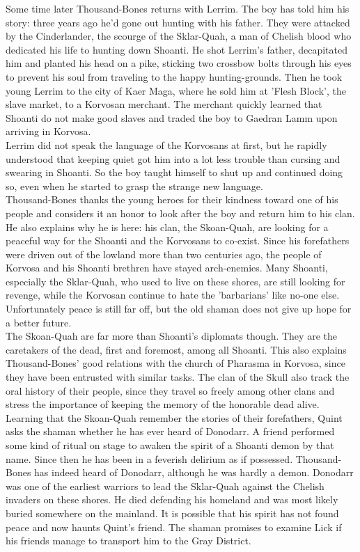 Some time later Thousand-Bones returns with Lerrim. The boy has told him his story: three years ago he'd gone out hunting with his father. They were attacked by the Cinderlander, the scourge of the Sklar-Quah, a man of Chelish blood who dedicated his life to hunting down Shoanti. He shot Lerrim's father, decapitated him and planted his head on a pike, sticking two crossbow bolts through his eyes to prevent his soul from traveling to the happy hunting-grounds. Then he took young Lerrim to the city of Kaer Maga, where he sold him at 'Flesh Block', the slave market, to a Korvosan merchant. The merchant quickly learned that Shoanti do not make good slaves and traded the boy to Gaedran Lamm upon arriving in Korvosa.\\

Lerrim did not speak the language of the Korvosans at first, but he rapidly understood that keeping quiet got him into a lot less trouble than cursing and swearing in Shoanti. So the boy taught himself to shut up and continued doing so, even when he started to grasp the strange new language.\\

Thousand-Bones thanks the young heroes for their kindness toward one of his people and considers it an honor to look after the boy and return him to his clan. He also explains why he is here: his clan, the Skoan-Quah, are looking for a peaceful way for the Shoanti and the Korvosans to co-exist. Since his forefathers were driven out of the lowland more than two centuries ago, the people of Korvosa and his Shoanti brethren have stayed arch-enemies. Many Shoanti, especially the Sklar-Quah, who used to live on these shores, are still looking for revenge, while the Korvosan continue to hate the 'barbarians' like no-one else. Unfortunately peace is still far off, but the old shaman does not give up hope for a better future.\\

The Skoan-Quah are far more than Shoanti's diplomats though. They are the caretakers of the dead, first and foremost, among all Shoanti. This also explains Thousand-Bones' good relations with the church of Pharasma in Korvosa, since they have been entrusted with similar tasks. The clan of the Skull also track the oral history of their people, since they travel so freely among other clans and stress the importance of keeping the memory of the honorable dead alive.\\

Learning that the Skoan-Quah remember the stories of their forefathers, Quint asks the shaman whether he has ever heard of Donodarr. A friend performed some kind of ritual on stage to awaken the spirit of a Shoanti demon by that name. Since then he has been in a feverish delirium as if possessed. Thousand-Bones has indeed heard of Donodarr, although he was hardly a demon. Donodarr was one of the earliest warriors to lead the Sklar-Quah against the Chelish invaders on these shores. He died defending his homeland and was most likely buried somewhere on the mainland. It is possible that his spirit has not found peace and now haunts Quint's friend. The shaman promises to examine Lick if his friends manage to transport him to the Gray District.\\

